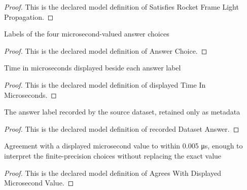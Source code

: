 \begin{proof}
  This is the declared model definition of Satisfies Rocket Frame Light Propagation.
\end{proof}
\begin{definition}
  \label{def:physics:phyx-mini-0568:phyxminiproblems-problemphyxmini0568-answerchoice}
  Labels of the four microsecond-valued answer choices
\end{definition}
\begin{proof}
  This is the declared model definition of Answer Choice.
\end{proof}
\begin{definition}
  \label{def:physics:phyx-mini-0568:phyxminiproblems-problemphyxmini0568-displayedtimeinmicroseconds}
  Time in microseconds displayed beside each answer label
\end{definition}
\begin{proof}
  This is the declared model definition of displayed Time In Microseconds.
\end{proof}
\begin{definition}
  \label{def:physics:phyx-mini-0568:phyxminiproblems-problemphyxmini0568-recordeddatasetanswer}
  The answer label recorded by the source dataset, retained only as metadata
\end{definition}
\begin{proof}
  This is the declared model definition of recorded Dataset Answer.
\end{proof}
\begin{definition}
  \label{def:physics:phyx-mini-0568:phyxminiproblems-problemphyxmini0568-agreeswithdisplayedmicrosecondvalue}
  Agreement with a displayed microsecond value to within 0.005 μs, enough to interpret the finite-precision choices without replacing the exact value
\end{definition}
\begin{proof}
  This is the declared model definition of Agrees With Displayed Microsecond Value.
\end{proof}
